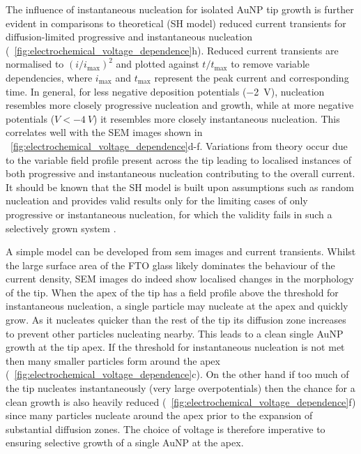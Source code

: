 \documentclass{article}
\begin{document}
The influence of instantaneous nucleation for isolated AuNP tip growth is further evident in comparisons to theoretical (SH model) reduced current transients for diffusion-limited progressive and instantaneous nucleation (\figurename~\ref{fig:electrochemical_voltage_dependence}h). Reduced current transients are normalised to $(i/i_{\mathrm{max}})^2$ and plotted against $t/t_{\mathrm{max}}$ to remove variable dependencies, where $i_{\mathrm{max}}$ and $t_{\mathrm{max}}$ represent the peak current and corresponding time. In general, for less negative deposition potentials (\SI{-2}{V}), nucleation resembles more closely progressive nucleation and growth, while at more negative potentials ($V < \SI{-4}{V}$) it resembles more closely instantaneous nucleation. This correlates well with the SEM images shown in \figurename~\ref{fig:electrochemical_voltage_dependence}d-f. Variations from theory occur due to the variable field profile present across the tip leading to localised instances of both progressive and instantaneous nucleation contributing to the overall current. It should be known that the SH model is built upon assumptions such as random nucleation and provides valid results only for the limiting cases of only progressive or instantaneous nucleation, for which the validity fails in such a selectively grown system \cite{dudin2010}.

A simple model can be developed from \gls{sem} images and current transients. Whilst the large surface area of the FTO glass likely dominates the behaviour of the current density, SEM images do indeed show localised changes in the morphology of the tip. When the apex of the tip has a field profile above the threshold for instantaneous nucleation, a single particle may nucleate at the apex and quickly grow. As it nucleates quicker than the rest of the tip its diffusion zone increases to prevent other particles nucleating nearby. This leads to a clean single AuNP growth at the tip apex. If the threshold for instantaneous nucleation is not met then many smaller particles form around the apex (\figurename~\ref{fig:electrochemical_voltage_dependence}c). On the other hand if too much of the tip nucleates instantaneously (very large overpotentials) then the chance for a clean growth is also heavily reduced (\figurename~\ref{fig:electrochemical_voltage_dependence}f) since many particles nucleate around the apex prior to the expansion of substantial diffusion zones. The choice of voltage is therefore imperative to ensuring selective growth of a single AuNP at the apex.
\end{document}
